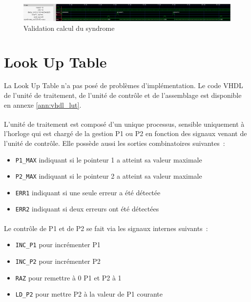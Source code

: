 \documentclass[a4paper, 11pt, svgnames]{report}
\begin{document}
            \begin{figure}[H]
                \centering
                \includegraphics[width=\textwidth]{./images/syndrome_simu.png}
                \caption{Validation calcul du syndrome}
                \label{fig:sim_syndrome}
            \end{figure}

        \section{Look Up Table}
            \paragraph{}
                La Look Up Table n'a pas posé de problèmes d'implémentation. Le
                code VHDL de l'unité de traitement, de l'unité de contrôle et
                de l'assemblage est disponible en annexe \ref{ann:vhdl_lut}.

            \paragraph{}
                L'unité de traitement est composé d'un unique processus, sensible
                uniquement à l'horloge qui est chargé de la gestion P1 ou P2 en
                fonction des signaux venant de l'unité de contrôle.
                Elle possède aussi les sorties combinatoires suivantes~:
                \begin{itemize}
                    \item \verb|P1_MAX| indiquant si le pointeur 1 a atteint sa valeur maximale
                    \item \verb|P2_MAX| indiquant si le pointeur 2 a atteint sa valeur maximale
                    \item \verb|ERR1| indiquant si une seule erreur a été détectée
                    \item \verb|ERR2| indiquant si deux erreurs ont été détectées
                \end{itemize}

            \paragraph{}
                Le contrôle de P1 et de P2 se fait via les signaux internes suivants~:
                \begin{itemize}
                    \item \verb|INC_P1| pour incrémenter P1
                    \item \verb|INC_P2| pour incrémenter P2
                    \item \verb|RAZ| pour remettre à 0 P1 et P2 à 1
                    \item \verb|LD_P2| pour mettre P2 à la valeur de P1 courante
                \end{itemize}
\end{document}
